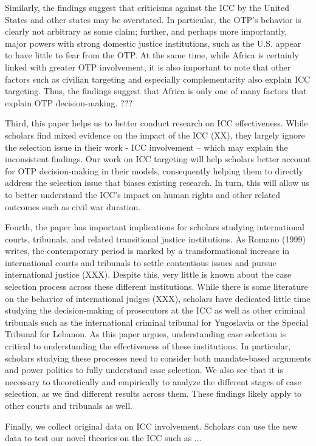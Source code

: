 Similarly, the findings suggest that criticisms against the ICC by the United States and other states may be overstated. In particular, the OTP's behavior is clearly not arbitrary as some claim; further, and perhaps more importantly, major powers with strong domestic justice institutions, such as the U.S. appear to have little to fear from the OTP. At the same time, while Africa is certainly linked with greater OTP involvement, it is also important to note that other factors such as civilian targeting and especially complementarity also explain ICC targeting. Thus, the findings suggest that Africa is only one of many factors that explain OTP decision-making. ???

Third, this paper helps us to better conduct research on ICC effectiveness. While scholars find mixed evidence on the impact of the ICC (XX), they largely ignore the selection issue in their work - ICC involvement -- which may explain the inconsistent findings. Our work on ICC targeting will help scholars better account for OTP decision-making in their models, consequently helping them to directly address the selection issue that biases existing research. In turn, this will allow us to better understand the ICC's impact on human rights and other related outcomes such as civil war duration.

Fourth, the paper has important implications for scholars studying international courts, tribunals, and related transitional justice institutions. As Romano (1999) writes, the contemporary period is marked by a transformational increase in international courts and tribunals to settle contentious issues and pursue international justice (XXX). Despite this, very little is known about the case selection process across these different institutions. While there is some literature on the behavior of international judges (XXX), scholars have dedicated little time studying the decision-making of prosecutors at the ICC as well as other criminal tribunals such as the international criminal tribunal for Yugoslavia or the Special Tribunal for Lebanon. As this paper argues, understanding case selection is critical to understanding the effectiveness of these institutions. In particular, scholars studying these processes need to consider both mandate-based arguments and power politics to fully understand case selection. We also see that it is necessary to theoretically and empirically to analyze the different stages of case selection, as we find different results across them. These findings likely apply to other courts and tribunals as well.

Finally, we collect original data on ICC involvement. Scholars can use the new data to test our novel theories on the ICC such as ...